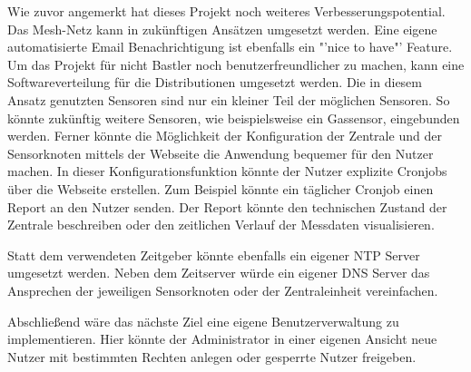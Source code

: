 	Wie zuvor angemerkt hat dieses Projekt noch weiteres Verbesserungspotential. Das Mesh-Netz kann in zukünftigen Ansätzen umgesetzt werden. Eine eigene automatisierte Email Benachrichtigung ist ebenfalls ein "'nice to have"' Feature. Um das Projekt für nicht Bastler noch benutzerfreundlicher zu machen, kann eine Softwareverteilung für die Distributionen umgesetzt werden. Die in diesem Ansatz genutzten Sensoren sind nur ein kleiner Teil der möglichen Sensoren. So könnte zukünftig weitere Sensoren, wie beispielsweise ein Gassensor, eingebunden werden. Ferner könnte die Möglichkeit der Konfiguration der Zentrale und der Sensorknoten mittels der Webseite die Anwendung bequemer für den Nutzer machen. In dieser Konfigurationsfunktion könnte der Nutzer explizite Cronjobs über die Webseite erstellen. Zum Beispiel könnte ein täglicher Cronjob einen Report an den Nutzer senden. Der Report könnte den technischen Zustand der Zentrale beschreiben oder den zeitlichen Verlauf der Messdaten visualisieren.
	
	Statt dem verwendeten Zeitgeber könnte ebenfalls ein eigener \ac{NTP} Server umgesetzt werden. Neben dem Zeitserver würde ein eigener \ac{DNS} Server das Ansprechen der jeweiligen Sensorknoten oder der Zentraleinheit vereinfachen.
	
	Abschließend wäre das nächste Ziel eine eigene Benutzerverwaltung zu implementieren. Hier könnte der Administrator in einer eigenen Ansicht neue Nutzer mit bestimmten Rechten anlegen oder gesperrte Nutzer freigeben.
